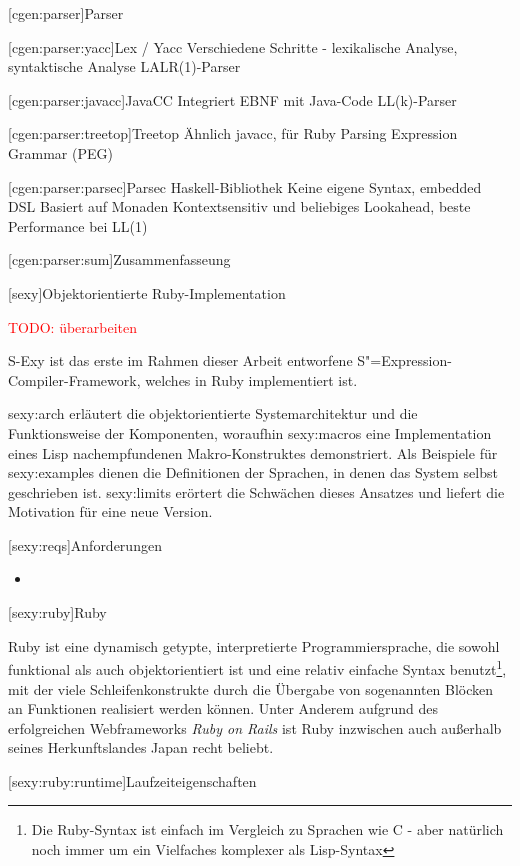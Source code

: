 \documentclass[a4paper, bibgerm]{book}
\newcommand{\todo}[1]{
  \textcolor{red}{TODO: #1}
}
\newcommand\lchapter{}
\newcommand\lsection{}
\newcommand\lsubsection{}
\newcommand\sref{}
\newcommand{\sexy}{S-Exy}
\newcommand{\sexp}{S"=Expression}
\begin{document}
\lsection[cgen:parser]{Parser}

\lsubsection[cgen:parser:yacc]{Lex / Yacc}
Verschiedene Schritte - lexikalische Analyse, syntaktische Analyse 
LALR(1)-Parser

\lsubsection[cgen:parser:javacc]{JavaCC}
 Integriert EBNF mit Java-Code
 LL(k)-Parser

\lsubsection[cgen:parser:treetop]{Treetop}
 Ähnlich javacc, für Ruby
 Parsing Expression Grammar (PEG)

\lsubsection[cgen:parser:parsec]{Parsec}
 Haskell-Bibliothek
 Keine eigene Syntax, embedded DSL
 Basiert auf Monaden
 Kontextsensitiv und beliebiges Lookahead, beste Performance bei LL(1)

\lsubsection[cgen:parser:sum]{Zusammenfasseung}

\lchapter[sexy]{Objektorientierte Ruby-Implementation}

\todo{überarbeiten}

\sexy{} ist das erste im Rahmen dieser Arbeit entworfene
\sexp{}-Compiler-Framework, welches in Ruby implementiert ist.

\sref{sexy:arch} erläutert die objektorientierte
Systemarchitektur und die Funktionsweise der Komponenten, woraufhin
\sref{sexy:macros} eine Implementation eines Lisp nachempfundenen
Makro-Konstruktes demonstriert. Als Beispiele für \sref{sexy:examples}
dienen die Definitionen der Sprachen, in denen das System selbst
geschrieben ist. \sref{sexy:limits} erörtert die Schwächen dieses
Ansatzes und liefert die Motivation für eine neue Version.

\lsection[sexy:reqs]{Anforderungen}

\begin{itemize}
\item 
\end{itemize}

\lsection[sexy:ruby]{Ruby}

Ruby ist eine dynamisch getypte, interpretierte Programmiersprache, die
sowohl funktional als auch objektorientiert ist und eine relativ
einfache Syntax benutzt\footnote{Die Ruby-Syntax ist einfach im
  Vergleich zu Sprachen wie C - aber natürlich noch immer um ein
  Vielfaches komplexer als Lisp-Syntax}, mit der viele
Schleifenkonstrukte durch die Übergabe von sogenannten Blöcken an
Funktionen realisiert werden können.  Unter Anderem aufgrund des
erfolgreichen Webframeworks \textit{Ruby on Rails} ist Ruby inzwischen
auch außerhalb seines Herkunftslandes Japan recht beliebt.

\lsubsection[sexy:ruby:runtime]{Laufzeiteigenschaften} 
\end{document}
